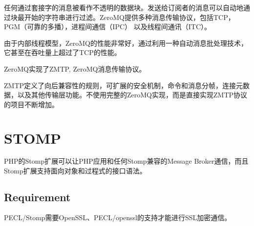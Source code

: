 任何通过套接字的消息被看作不透明的数据块。发送给订阅者的消息可以自动地通过块最开始的字符串进行过滤。ZeroMQ提供多种消息传输协议，包括TCP，PGM（可靠的多播），进程间通信（IPC） 以及线程间通讯（ITC）。

由于内部线程模型，ZeroMQ的性能非常好，通过利用一种自动消息批处理技术，它甚至在吞吐量上超过了TCP的性能。

ZeroMQ实现了ZMTP, ZeroMQ消息传输协议。

ZMTP定义了向后兼容性的规则，可扩展的安全机制，命令和消息分帧，连接元数据，以及其他传输层功能。不使用完整的ZeroMQ实现，而是直接实现ZMTP协议的项目不断增加。


\chapter{STOMP}


PHP的Stomp扩展可以让PHP应用和任何Stomp兼容的Message Broker通信，而且Stomp扩展支持面向对象和过程式的接口语法。

\section{Requirement}


PECL/Stomp需要OpenSSL、PECL/openssl的支持才能进行SSL加密通信。






